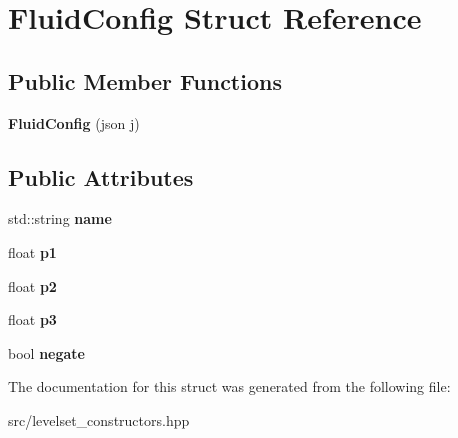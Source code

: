\hypertarget{structFluidConfig}{}\section{Fluid\+Config Struct Reference}
\label{structFluidConfig}
\subsection*{Public Member Functions}
\begin{DoxyCompactItemize}
\item 
\mbox{\label{structFluidConfig_a4eab622d9cd3c88a0d24e59df32afa25}} 
{\bfseries Fluid\+Config} (json j)
\end{DoxyCompactItemize}
\subsection*{Public Attributes}
\begin{DoxyCompactItemize}
\item 
\mbox{\label{structFluidConfig_ac92020b08460088d925efa657d654015}} 
std\+::string {\bfseries name}
\item 
\mbox{\label{structFluidConfig_abadddb12e509ac4797816aea874ccea0}} 
float {\bfseries p1}
\item 
\mbox{\label{structFluidConfig_a3a510c379faceea65bb30e89133859bf}} 
float {\bfseries p2}
\item 
\mbox{\label{structFluidConfig_af353af257d0594b4d87c640e3792bfb5}} 
float {\bfseries p3}
\item 
\mbox{\label{structFluidConfig_a0a2d713e07cd37e2cf6f3b3063e08fcc}} 
bool {\bfseries negate}
\end{DoxyCompactItemize}


The documentation for this struct was generated from the following file\+:\begin{DoxyCompactItemize}
\item 
src/levelset\+\_\+constructors.\+hpp\end{DoxyCompactItemize}

